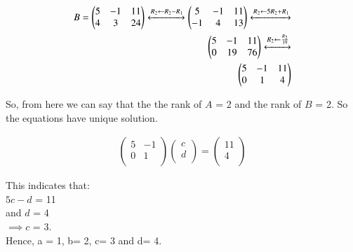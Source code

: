 \begin{equation}
\begin{aligned}
    B=  \begin{pmatrix}
      5       & -1   & 11\\ 
      4       & 3  & 24\\
            
    \end{pmatrix}\xleftrightarrow[]{R_2\leftarrow R_2 - R_1} 
    \begin{pmatrix}
      5       & -1   & 11\\ 
      -1       & 4  & 13\\
            
    \end{pmatrix} \xleftrightarrow[]{R_2\leftarrow 5R_2+R_1}\\
    \begin{pmatrix}
      5       & -1   & 11\\ 
      0       & 19  & 76\\
            
    \end{pmatrix}\xleftrightarrow[]{R_2\leftarrow \frac{R_2}{19}}\\
    \begin{pmatrix}
      5       & -1   & 11\\ 
      0       & 1  & 4\\
            
    \end{pmatrix}
\end{aligned}
\end{equation}

So, from here we can say that the the rank of $A$ = 2 and the rank of $B$ = 2.
So the equations have unique solution.

\begin{equation}
\begin{aligned}
      \begin{pmatrix}
      5       & -1\\ 
      0       & 1\\
            
    \end{pmatrix} \begin{pmatrix}
      c\\ 
      d\\
            
    \end{pmatrix} = \begin{pmatrix}
      11\\ 
      4\\
            
    \end{pmatrix} 
\end{aligned}
\end{equation}

This indicates that:\\
$5c-d$ = 11\\
and $d$ = 4\\
$\implies  c$ = 3.\\
Hence, a = 1, b= 2, c= 3 and d= 4.





